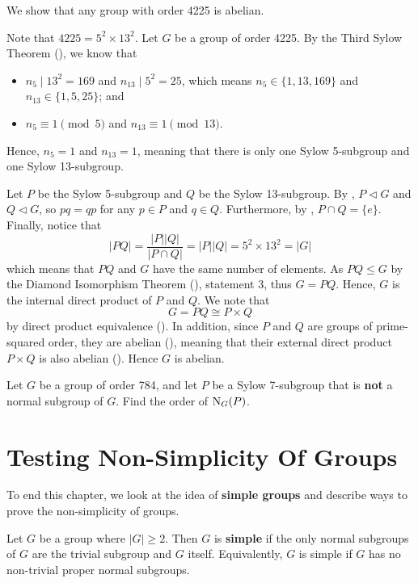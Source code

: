 \begin{example}
    We show that any group with order 4225 is abelian.

    Note that $4225 = 5^2 \times 13^2$. Let $G$ be a group of order 4225. By the Third Sylow Theorem (), we know that
    \begin{itemize}
        \item $n_5 \mid 13^2 = 169$ and $n_{13} \mid 5^2 = 25$, which means $n_5 \in \{1, 13, 169\}$ and $n_{13} \in \{1, 5, 25\}$; and
        \item $n_5 \equiv 1 \pmod 5$ and $n_{13} \equiv 1 \pmod{13}$.
    \end{itemize}
    Hence, $n_5 = 1$ and $n_{13} = 1$, meaning that there is only one Sylow 5-subgroup and one Sylow 13-subgroup.

    Let $P$ be the Sylow 5-subgroup and $Q$ be the Sylow 13-subgroup. By , $P \lhd G$ and $Q \lhd G$, so $pq = qp$ for any $p \in P$ and $q \in Q$. Furthermore, by , $P \cap Q = \{e\}$. Finally, notice that
    \[
        |PQ| = \frac{|P||Q|}{|P\cap Q|} = |P||Q| = 5^2\times13^2 = |G|
    \]
    which means that $PQ$ and $G$ have the same number of elements. As $PQ \leq G$ by the Diamond Isomorphism Theorem (), statement 3, thus $G = PQ$. Hence, $G$ is the internal direct product of $P$ and $Q$. We note that
    \[
        G = PQ \cong P\times Q
    \]
    by direct product equivalence (). In addition, since $P$ and $Q$ are groups of prime-squared order, they are abelian (), meaning that their external direct product $P\times Q$ is also abelian (). Hence $G$ is abelian.
\end{example}

\begin{exercise}
    Let $G$ be a group of order 784, and let $P$ be a Sylow 7-subgroup that is \textbf{not} a normal subgroup of $G$. Find the order of $\mathrm{N}_{G}(P)$.
\end{exercise}

\newpage

\section{Testing Non-Simplicity Of Groups}
To end this chapter, we look at the idea of \textbf{simple groups} and describe ways to prove the non-simplicity of groups.
\begin{definition}
    Let $G$ be a group where $|G| \geq 2$. Then $G$ is \textbf{simple} if the only normal subgroups of $G$ are the trivial subgroup and $G$ itself. Equivalently, $G$ is simple if $G$ has no non-trivial proper normal subgroups.
\end{definition}

